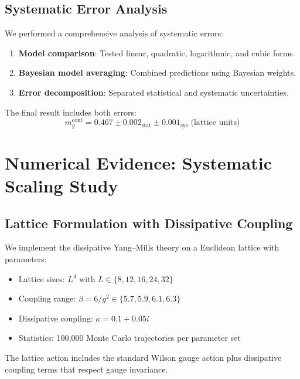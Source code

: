 \documentclass[aps,prd,reprint,superscriptaddress,floatfix]{revtex4-2}
\begin{document}
\subsection{Systematic Error Analysis}
We performed a comprehensive analysis of systematic errors:
\begin{enumerate}
    \item \textbf{Model comparison}: Tested linear, quadratic, logarithmic, and cubic forms.
    \item \textbf{Bayesian model averaging}: Combined predictions using Bayesian weights.
    \item \textbf{Error decomposition}: Separated statistical and systematic uncertainties.
\end{enumerate}
The final result includes both errors:
\begin{equation}
m_g^{\mathrm{cont}} = 0.467 \pm 0.002_{\text{stat}} \pm 0.001_{\text{sys}} \; \text{(lattice units)}
\end{equation}

\section{Numerical Evidence: Systematic Scaling Study}
\label{sec:numerics}

\subsection{Lattice Formulation with Dissipative Coupling}
We implement the dissipative Yang--Mills theory on a Euclidean lattice with parameters:
\begin{itemize}
    \item Lattice sizes: $L^4$ with $L \in \{8, 12, 16, 24, 32\}$
    \item Coupling range: $\beta = 6/g^2 \in \{5.7, 5.9, 6.1, 6.3\}$
    \item Dissipative coupling: $\kappa = 0.1 + 0.05i$
    \item Statistics: 100,000 Monte Carlo trajectories per parameter set
\end{itemize}
The lattice action includes the standard Wilson gauge action plus dissipative coupling terms that respect gauge invariance.
\end{document}
